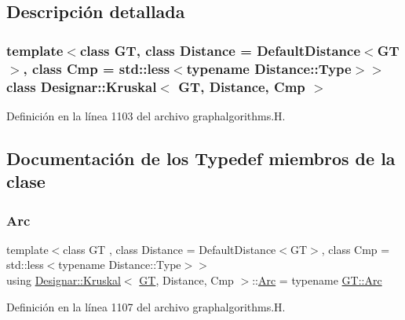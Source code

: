 \subsection{Descripción detallada}
\subsubsection*{template$<$class GT, class Distance = Default\+Distance$<$\+G\+T$>$, class Cmp = std\+::less$<$typename Distance\+::\+Type$>$$>$\newline
class Designar\+::\+Kruskal$<$ G\+T, Distance, Cmp $>$}



Definición en la línea 1103 del archivo graphalgorithms.\+H.



\subsection{Documentación de los \textquotesingle{}Typedef\textquotesingle{} miembros de la clase}
\mbox{\label{class_designar_1_1_kruskal_a90eba06ada80f8b0b010782c15c0e52a}} 
\subsubsection{\texorpdfstring{Arc}{Arc}}
{\footnotesize\ttfamily template$<$class GT , class Distance  = Default\+Distance$<$\+G\+T$>$, class Cmp  = std\+::less$<$typename Distance\+::\+Type$>$$>$ \\
using \hyperlink{class_designar_1_1_kruskal}{Designar\+::\+Kruskal}$<$ \hyperlink{demo-buildgraph_8_c_a3001c40d2c31ca87ed96cd7d1334a55e}{GT}, Distance, Cmp $>$\+::\hyperlink{class_designar_1_1_kruskal_a90eba06ada80f8b0b010782c15c0e52a}{Arc} =  typename \hyperlink{class_designar_1_1_graph_a74c730ef4ce2d20f998d72bd25c2b5bf}{G\+T\+::\+Arc}}



Definición en la línea 1107 del archivo graphalgorithms.\+H.

\mbox{\label{class_designar_1_1_kruskal_ae877bf49a387ddf132cfd824a0d258dd}} 
